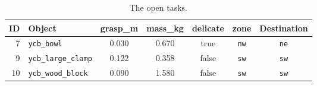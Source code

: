 \begin{table}[H]
\centering
\caption{The open tasks.}
\label{tab:appendix:tasks}
\begin{tabular}{rlccccc}
\toprule
ID & Object & grasp\_m & mass\_kg & delicate & zone & Destination \\
\midrule
7 & \texttt{ycb\_bowl} & 0.030 & 0.670 & true & \texttt{nw} & \texttt{ne} \\
9 & \texttt{ycb\_large\_clamp} & 0.122 & 0.358 & false & \texttt{sw} & \texttt{sw} \\
10 & \texttt{ycb\_wood\_block} & 0.090 & 1.580 & false & \texttt{sw} & \texttt{sw} \\
\bottomrule
\end{tabular}
\end{table}
